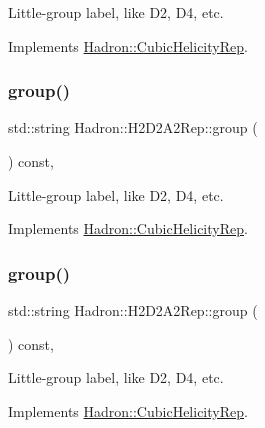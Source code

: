 Little-\/group label, like D2, D4, etc. 

Implements \mbox{\hyperlink{structHadron_1_1CubicHelicityRep_a101a7d76cd8ccdad0f272db44b766113}{Hadron\+::\+Cubic\+Helicity\+Rep}}.

\mbox{\label{structHadron_1_1H2D2A2Rep_a03d366c9b575134ad5bfdba3884b4181}} 
\subsubsection{\texorpdfstring{group()}{group()}\hspace{0.1cm}{\footnotesize\ttfamily [3/5]}}
{\footnotesize\ttfamily std\+::string Hadron\+::\+H2\+D2\+A2\+Rep\+::group (\begin{DoxyParamCaption}{ }\end{DoxyParamCaption}) const\hspace{0.3cm}{\ttfamily [inline]}, {\ttfamily [virtual]}}

Little-\/group label, like D2, D4, etc. 

Implements \mbox{\hyperlink{structHadron_1_1CubicHelicityRep_a101a7d76cd8ccdad0f272db44b766113}{Hadron\+::\+Cubic\+Helicity\+Rep}}.

\mbox{\label{structHadron_1_1H2D2A2Rep_a03d366c9b575134ad5bfdba3884b4181}} 
\subsubsection{\texorpdfstring{group()}{group()}\hspace{0.1cm}{\footnotesize\ttfamily [4/5]}}
{\footnotesize\ttfamily std\+::string Hadron\+::\+H2\+D2\+A2\+Rep\+::group (\begin{DoxyParamCaption}{ }\end{DoxyParamCaption}) const\hspace{0.3cm}{\ttfamily [inline]}, {\ttfamily [virtual]}}

Little-\/group label, like D2, D4, etc. 

Implements \mbox{\hyperlink{structHadron_1_1CubicHelicityRep_a101a7d76cd8ccdad0f272db44b766113}{Hadron\+::\+Cubic\+Helicity\+Rep}}.

\mbox{\label{structHadron_1_1H2D2A2Rep_a03d366c9b575134ad5bfdba3884b4181}} 
